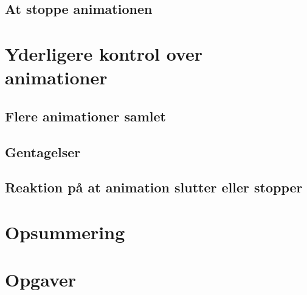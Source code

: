 \subsection{At stoppe animationen}
\section{Yderligere kontrol over animationer}
\subsection{Flere animationer samlet}
\subsection{Gentagelser}
\subsection{Reaktion på at animation slutter eller stopper}
\section{Opsummering}
\section{Opgaver}